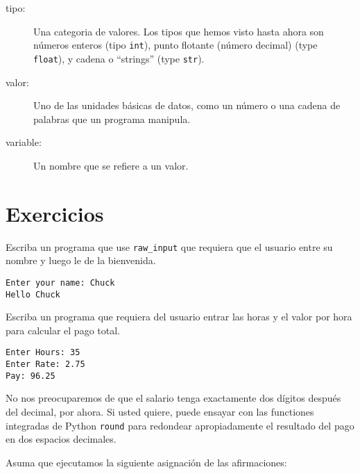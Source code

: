 \begin{ex}
\begin{description}
\item[tipo:] Una categoria de valores.  Los tipos que hemos visto hasta ahora son n\'umeros enteros (tipo {\tt int}), punto flotante (n\'umero decimal) (type {\tt
float}), y cadena o ``strings'' (type {\tt str}).

\item[valor:]  Uno de las unidades b\'asicas de datos, como un n\'umero o una cadena de palabras que un programa manipula.

\item[variable:]  Un nombre que se refiere a un valor.









\end{description}

\section{Exercicios}

\begin{ex}

Escriba un programa que use \verb"raw_input" que requiera que el usuario entre su nombre y luego le de la bienvenida.



\begin{verbatim}
Enter your name: Chuck
Hello Chuck
\end{verbatim}

\end{ex}

\begin{ex}

Escriba un programa que requiera del usuario entrar las horas y el valor por hora para calcular el pago total.


\begin{verbatim}
Enter Hours: 35
Enter Rate: 2.75
Pay: 96.25
\end{verbatim}
\end{ex}
%

No nos preocuparemos de que el salario tenga exactamente dos d\'igitos despu\'es del decimal, por ahora. Si usted quiere, puede ensayar con las functiones integradas de Python {\tt round} para redondear apropiadamente el resultado del pago en dos espacios decimales.

\begin{ex}
Asuma que ejecutamos la siguiente asignaci\'on de las afirmaciones:






\end{ex}
\end{ex}
